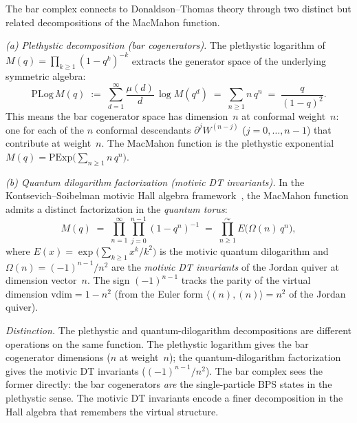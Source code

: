 \begin{computation}
\label{comp:dt-jordan}
The bar complex connects to Donaldson--Thomas theory through
two distinct but related decompositions of the MacMahon function.

\emph{(a) Plethystic decomposition \textup{(}bar cogenerators\textup{)}.}
The plethystic logarithm of $M(q) = \prod_{k \ge 1}(1-q^k)^{-k}$
extracts the generator space of the underlying symmetric algebra:
\begin{equation}\label{eq:plethystic-log}
 \mathrm{PLog}\, M(q)
 \;:=\;
 \sum_{d=1}^{\infty} \frac{\mu(d)}{d}\, \log M(q^d)
 \;=\;
 \sum_{n \ge 1} n\, q^n
 \;=\;
 \frac{q}{(1-q)^2}.
\end{equation}
This means the bar cogenerator space has dimension~$n$ at
conformal weight~$n$: one for each of the $n$ conformal descendants
$\partial^j W^{(n-j)}$ ($j = 0, \ldots, n-1$) that contribute at
weight~$n$. The MacMahon function is the plethystic exponential
$M(q) = \mathrm{PExp}\bigl(\sum_{n \ge 1} n\, q^n\bigr)$.

\emph{(b) Quantum dilogarithm factorization \textup{(}motivic DT
invariants\textup{)}.}
In the Kontsevich--Soibelman motivic Hall algebra
framework~\cite{kontsevich-soibelman}, the MacMahon function admits
a distinct factorization in the \emph{quantum torus}:
\begin{equation}\label{eq:dt-jordan-formula}
 M(q)
 \;=\;
 \prod_{n=1}^{\infty}
 \prod_{j=0}^{n-1}
 (1 - q^n)^{-1}
 \;=\;
 \prod_{n \ge 1}^{\curvearrowright}
 E\bigl(\Omega(n)\, q^n\bigr),
\end{equation}
where $E(x) = \exp\bigl(\sum_{k \ge 1} x^k/k^2\bigr)$ is the
motivic quantum dilogarithm and
$\Omega(n) = (-1)^{n-1}/n^2$
are the \emph{motivic DT invariants} of the Jordan quiver at
dimension vector~$n$. The sign $(-1)^{n-1}$ tracks the parity
of the virtual dimension $\mathrm{vdim} = 1 - n^2$
(from the Euler form $\langle (n), (n) \rangle = n^2$ of the
Jordan quiver).

\emph{Distinction.} The plethystic and quantum-dilogarithm
decompositions are different operations on the same function. The
plethystic logarithm gives the bar cogenerator dimensions
($n$ at weight~$n$); the quantum-dilogarithm factorization gives
the motivic DT invariants ($(-1)^{n-1}/n^2$). The bar complex
sees the former directly: the bar cogenerators \emph{are} the
single-particle BPS states in the plethystic sense. The motivic
DT invariants encode a finer decomposition in the Hall algebra that
remembers the virtual structure.
\end{computation}

